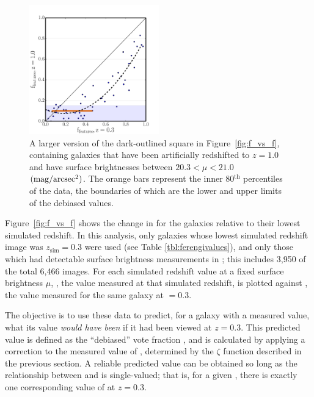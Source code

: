 \documentclass[twocolumn]{aastex6}
\begin{document}
\begin{figure}
\centering
\includegraphics[width=0.5\textwidth]{figures/z1_mu20_subplot2.pdf}
\caption{A larger version of the dark-outlined square in Figure~\ref{fig:f_vs_f}, containing
\ferengi{} galaxies that have been artificially redshifted to $z=1.0$ and have
surface brightnesses between $20.3 < \mu < 21.0$ $\rm (mag/arcsec^2)$. The orange bars represent the inner
80$^\mathrm{th}$ percentiles of the data, the boundaries of which are the lower
and upper limits of the debiased values.}
\label{fig:f_vs_f_zoom}
\end{figure}


Figure~\ref{fig:f_vs_f} shows the change in \ffeatures{} for the \ferengi{}
galaxies relative to their lowest simulated redshift. In this analysis, only
galaxies whose lowest simulated redshift image was $z_\mathrm{sim}=0.3$ were
used (see Table \ref{tbl:ferengivalues}), and only those which had detectable
surface brightness measurements in \sextractor; this includes 3,950 of the
total 6,466 images. For each simulated redshift value \zsim{} at a fixed
surface brightness $\mu$, \ffeaturesz, the value measured at that simulated
redshift, is plotted against \ffeaturesrest, the value measured for the same
galaxy at \zsim$=0.3$. 
 
The objective is to use these data to predict, for a galaxy with a measured
\ffeaturesz{} value, what its \ffeatures{} value \emph{would have been} if it
had been viewed at $z=0.3$. This predicted value is defined as the ``debiased''
vote fraction \ffeaturesdebiased, and is calculated by applying a correction to
the measured value of \ffeatures, determined by the $\zeta$ function described
in the previous section. A reliable predicted value can be obtained so long as
the relationship between \ffeaturesz{} and \ffeaturesrest{} is single-valued;
that is, for a given \ffeaturesz, there is exactly one corresponding value of
\ffeatures{} at $z=0.3$. 
\end{document}
